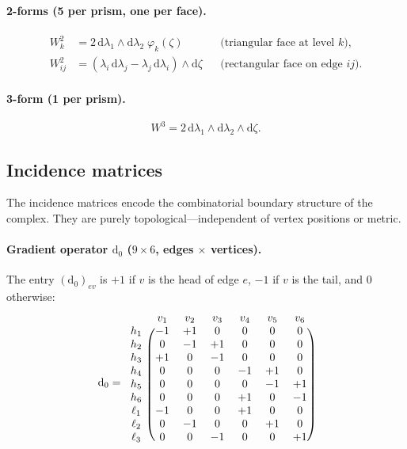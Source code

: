 \documentclass[11pt,a4paper]{article}
\newcommand{\dd}{\mathrm{d}}
\begin{document}
\paragraph{2-forms (5 per prism, one per face).}
\begin{align}
  W^2_k &= 2\,\dd\lambda_1 \wedge \dd\lambda_2 \;\varphi_k(\zeta)
  && \text{(triangular face at level $k$)},
  \label{eq:W2tri} \\
  W^2_{ij} &= (\lambda_i \, \dd\lambda_j - \lambda_j \, \dd\lambda_i)
    \wedge \dd\zeta
  && \text{(rectangular face on edge $ij$)}.
  \label{eq:W2rect}
\end{align}

\paragraph{3-form (1 per prism).}
\begin{equation}
  W^3 = 2\,\dd\lambda_1 \wedge \dd\lambda_2 \wedge \dd\zeta.
  \label{eq:W3}
\end{equation}

\subsection{Incidence matrices}
\label{sec:incidence}

The incidence matrices encode the combinatorial boundary structure of the
complex. They are purely topological---independent of vertex positions or
metric.

\paragraph{Gradient operator $\dd_0$ ($9\times 6$, edges $\times$ vertices).}
The entry $(\dd_0)_{ev}$ is $+1$ if $v$ is the head of edge $e$, $-1$ if
$v$ is the tail, and $0$ otherwise:
\begin{equation}
  \dd_0 =
  \begin{blockarray}{ccccccc}
    & v_1 & v_2 & v_3 & v_4 & v_5 & v_6 \\
    \begin{block}{c(cccccc)}
      h_1 & -1 & +1 &  0 &  0 &  0 &  0 \\
      h_2 &  0 & -1 & +1 &  0 &  0 &  0 \\
      h_3 & +1 &  0 & -1 &  0 &  0 &  0 \\
      h_4 &  0 &  0 &  0 & -1 & +1 &  0 \\
      h_5 &  0 &  0 &  0 &  0 & -1 & +1 \\
      h_6 &  0 &  0 &  0 & +1 &  0 & -1 \\
      \ell_1 & -1 &  0 &  0 & +1 &  0 &  0 \\
      \ell_2 &  0 & -1 &  0 &  0 & +1 &  0 \\
      \ell_3 &  0 &  0 & -1 &  0 &  0 & +1 \\
    \end{block}
  \end{blockarray}
  \label{eq:d0}
\end{equation}
\end{document}
